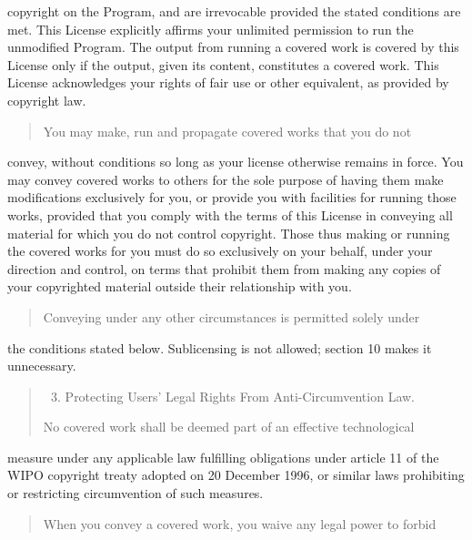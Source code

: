 \documentclass[letterpaper,10pt,english]{sphinxmanual}
\begin{document}
copyright on the Program, and are irrevocable provided the stated
conditions are met.  This License explicitly affirms your unlimited
permission to run the unmodified Program.  The output from running a
covered work is covered by this License only if the output, given its
content, constitutes a covered work.  This License acknowledges your
rights of fair use or other equivalent, as provided by copyright law.
\begin{quote}

You may make, run and propagate covered works that you do not
\end{quote}

convey, without conditions so long as your license otherwise remains
in force.  You may convey covered works to others for the sole purpose
of having them make modifications exclusively for you, or provide you
with facilities for running those works, provided that you comply with
the terms of this License in conveying all material for which you do
not control copyright.  Those thus making or running the covered works
for you must do so exclusively on your behalf, under your direction
and control, on terms that prohibit them from making any copies of
your copyrighted material outside their relationship with you.
\begin{quote}

Conveying under any other circumstances is permitted solely under
\end{quote}

the conditions stated below.  Sublicensing is not allowed; section 10
makes it unnecessary.
\begin{quote}
\begin{enumerate}
\setcounter{enumi}{2}
\item {} 
Protecting Users’ Legal Rights From Anti-Circumvention Law.

\end{enumerate}

No covered work shall be deemed part of an effective technological
\end{quote}

measure under any applicable law fulfilling obligations under article
11 of the WIPO copyright treaty adopted on 20 December 1996, or
similar laws prohibiting or restricting circumvention of such
measures.
\begin{quote}

When you convey a covered work, you waive any legal power to forbid
\end{quote}
\end{document}
